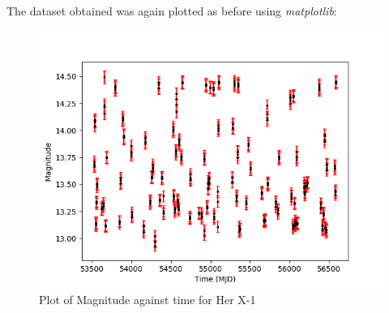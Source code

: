 \documentclass[11pt]{article}
\begin{document}
The dataset obtained was again plotted as before using \textit{matplotlib}:
\begin{figure}[htp]
\centering
\includegraphics[scale=0.90]{Plot_1_2.png}
\caption{Plot of Magnitude against time for Her X-1}
\label{plot_highlevel}
\end{figure}
\end{document}
